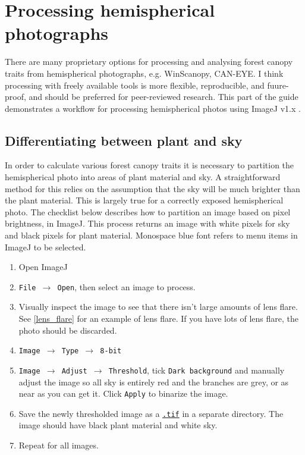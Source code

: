 \documentclass{article}
\newcommand\menu[1]{\texttt{\color{blue}#1}}
\newcommand\file[1]{\texttt{\underline{#1}}}
\begin{document}
\section{Processing hemispherical photographs}

There are many proprietary options for processing and analysing forest canopy traits from hemispherical photographs, e.g. WinScanopy, CAN-EYE. I think processing with freely available tools is more flexible, reproducible, and fuure-proof, and should be preferred for peer-reviewed research. This part of the guide demonstrates a workflow for processing hemispherical photos using ImageJ v1.x \citep{Schneider2012}.

\subsection{Differentiating between plant and sky}

In order to calculate various forest canopy traits it is necessary to partition the hemispherical photo into areas of plant material and sky. A straightforward method for this relies on the assumption that the sky will be much brighter than the plant material. This is largely true for a correctly exposed hemispherical photo. The checklist below describes how to partition an image based on pixel brightness, in ImageJ. This process returns an image with white pixels for sky and black pixels for plant material. Monospace blue font refers to menu items in ImageJ to be selected.

\begin{enumerate}
	\item{Open ImageJ}
	\item{\menu{File $\rightarrow$ Open}, then select an image to process.}
	\item{Visually inspect the image to see that there isn't large amounts of lens flare. See \autoref{lens_flare} for an example of lens flare. If you have lots of lens flare, the photo should be discarded.}
	\item{\menu{Image $\rightarrow$ Type $\rightarrow$ 8-bit}}
	\item{\menu{Image $\rightarrow$ Adjust $\rightarrow$ Threshold}, tick \menu{Dark background} and manually adjust the image so all sky is entirely red and the branches are grey, or as near as you can get it. Click \menu{Apply} to binarize the image.}
	\item{Save the newly thresholded image as a \file{.tif} in a separate directory. The image should have black plant material and white sky.}
	\item{Repeat for all images.}
\end{enumerate}
\end{document}
